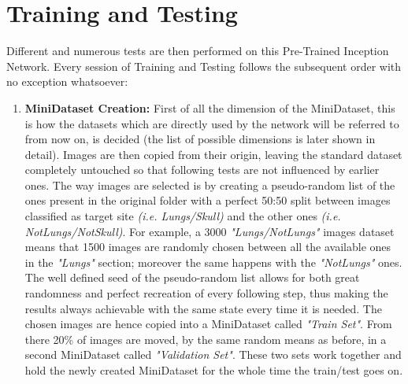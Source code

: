 \documentclass[../main.tex]{subfiles}
\begin{document}
\section{Training and Testing}
Different and numerous tests are then performed on this Pre-Trained Inception Network. Every session of Training and Testing follows the subsequent order with no exception whatsoever:
\begin{enumerate}
	\item \textbf{MiniDataset Creation:} First of all the dimension of the MiniDataset, this is how the datasets which are directly used by the network will be referred to from now on, is decided (the list of possible dimensions is later shown in detail). Images are then copied from their origin, leaving the standard dataset completely untouched so that following tests are not influenced by earlier ones. The way images are selected is by creating a pseudo-random list of the ones present in the original folder with a perfect 50:50 split between images classified as target site \textit{(i.e. Lungs/Skull)} and the other ones \textit{(i.e. NotLungs/NotSkull)}. For example, a 3000 \textit{"Lungs/NotLungs"} images dataset means that 1500 images are randomly chosen between all the available ones in the \textit{"Lungs"} section; moreover the same happens with the \textit{"NotLungs"} ones. The well defined seed of the pseudo-random list allows for both great randomness and perfect recreation of every following step, thus making the results always achievable with the same state every time it is needed. The chosen images are hence copied into a MiniDataset called \textit{"Train Set"}. From there 20\% of images are moved, by the same random means as before, in a second MiniDataset called \textit{"Validation Set"}. These two sets work together and hold the newly created MiniDataset for the whole time the train/test goes on.


\end{enumerate}
\end{document}
